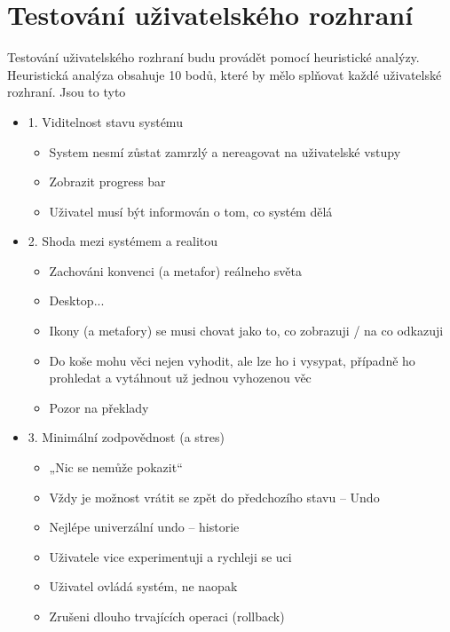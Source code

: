 \section{Testování uživatelského rozhraní}

\label{nur:test}

Testování uživatelského rozhraní budu provádět pomocí heuristické analýzy. Heuristická analýza obsahuje 10 bodů, které by mělo splňovat každé uživatelské rozhraní. Jsou to tyto \cite{nur-heu}

\begin{itemize}
    \item 1. Viditelnost stavu systému
        \begin{itemize}
            \item System nesmí zůstat zamrzlý a nereagovat na uživatelské vstupy
            \item Zobrazit progress bar
            \item Uživatel musí být informován o tom, co systém dělá
        \end{itemize}
    \item 2. Shoda mezi systémem a realitou
        \begin{itemize}
            \item Zachováni konvenci (a metafor) reálneho světa
            \item Desktop...
            \item Ikony (a metafory) se musi chovat jako to, co zobrazuji / na co odkazuji
            \item Do koše mohu věci nejen vyhodit, ale lze ho i vysypat, případně ho prohledat a vytáhnout už jednou vyhozenou věc
            \item Pozor na překlady
        \end{itemize}
    \item 3. Minimální zodpovědnost (a stres)
        \begin{itemize}
            \item „Nic se nemůže pokazit“
            \item Vždy je možnost vrátit se zpět do předchozího stavu – Undo
            \item Nejlépe univerzální undo – historie
            \item Uživatele vice experimentuji a rychleji se uci
            \item Uživatel ovládá systém, ne naopak
            \item Zrušeni dlouho trvajících operaci (rollback)

\end{itemize}
\end{itemize}
